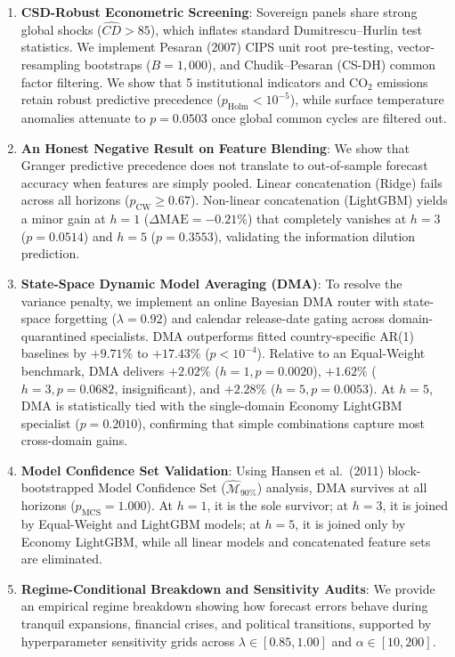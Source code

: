 \documentclass[11pt,a4paper]{article}
\begin{document}
\begin{enumerate}[leftmargin=*, label=\arabic*.]
    \item \textbf{CSD-Robust Econometric Screening}: Sovereign panels share strong global shocks ($\hat{CD} > 85$), which inflates standard Dumitrescu--Hurlin test statistics. We implement Pesaran (2007) CIPS unit root pre-testing, vector-resampling bootstraps ($B=1{,}000$), and Chudik--Pesaran (CS-DH) common factor filtering. We show that 5 institutional indicators and $\text{CO}_2$ emissions retain robust predictive precedence ($p_{\text{Holm}} < 10^{-5}$), while surface temperature anomalies attenuate to $p = 0.0503$ once global common cycles are filtered out.
    \item \textbf{An Honest Negative Result on Feature Blending}: We show that Granger predictive precedence does not translate to out-of-sample forecast accuracy when features are simply pooled. Linear concatenation (Ridge) fails across all horizons ($p_{\text{CW}} \ge 0.67$). Non-linear concatenation (LightGBM) yields a minor gain at $h=1$ ($\Delta\text{MAE} = -0.21\%$) that completely vanishes at $h=3$ ($p = 0.0514$) and $h=5$ ($p = 0.3553$), validating the information dilution prediction.
    \item \textbf{State-Space Dynamic Model Averaging (DMA)}: To resolve the variance penalty, we implement an online Bayesian DMA router with state-space forgetting ($\lambda = 0.92$) and calendar release-date gating across domain-quarantined specialists. DMA outperforms fitted country-specific AR(1) baselines by $+9.71\%$ to $+17.43\%$ ($p < 10^{-4}$). Relative to an Equal-Weight benchmark, DMA delivers $+2.02\%$ ($h=1, p=0.0020$), $+1.62\%$ ($h=3, p=0.0682$, insignificant), and $+2.28\%$ ($h=5, p=0.0053$). At $h=5$, DMA is statistically tied with the single-domain Economy LightGBM specialist ($p = 0.2010$), confirming that simple combinations capture most cross-domain gains.
    \item \textbf{Model Confidence Set Validation}: Using Hansen et al.\ (2011) block-bootstrapped Model Confidence Set ($\widehat{\mathcal{M}}_{90\%}$) analysis, DMA survives at all horizons ($p_{\text{MCS}} = 1.000$). At $h=1$, it is the sole survivor; at $h=3$, it is joined by Equal-Weight and LightGBM models; at $h=5$, it is joined only by Economy LightGBM, while all linear models and concatenated feature sets are eliminated.
    \item \textbf{Regime-Conditional Breakdown and Sensitivity Audits}: We provide an empirical regime breakdown showing how forecast errors behave during tranquil expansions, financial crises, and political transitions, supported by hyperparameter sensitivity grids across $\lambda \in [0.85, 1.00]$ and $\alpha \in [10, 200]$.
\end{enumerate}
\end{document}
